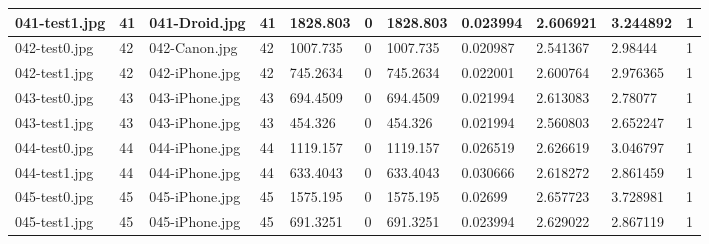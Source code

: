 \begin{landscape}
\begin{longtable}{|p{2cm}|p{1cm}|p{2cm}|p{1cm}|p{2cm}|p{1cm}|p{2cm}|p{2cm}|p{2cm}|p{2cm}|p{1cm}|}
		041-test1.jpg   & 41               & 041-Droid.jpg         & 41                          & 1828.803              & 0                       & 1828.803                   & 0.023994              & 2.606921              & 3.244892                 & 1                \\ \hline
		042-test0.jpg   & 42               & 042-Canon.jpg         & 42                          & 1007.735              & 0                       & 1007.735                   & 0.020987              & 2.541367              & 2.98444                  & 1                \\ \hline
		042-test1.jpg   & 42               & 042-iPhone.jpg        & 42                          & 745.2634              & 0                       & 745.2634                   & 0.022001              & 2.600764              & 2.976365                 & 1                \\ \hline
		043-test0.jpg   & 43               & 043-iPhone.jpg        & 43                          & 694.4509              & 0                       & 694.4509                   & 0.021994              & 2.613083              & 2.78077                  & 1                \\ \hline
		043-test1.jpg   & 43               & 043-iPhone.jpg        & 43                          & 454.326               & 0                       & 454.326                    & 0.021994              & 2.560803              & 2.652247                 & 1                \\ \hline
		044-test0.jpg   & 44               & 044-iPhone.jpg        & 44                          & 1119.157              & 0                       & 1119.157                   & 0.026519              & 2.626619              & 3.046797                 & 1                \\ \hline
		044-test1.jpg   & 44               & 044-iPhone.jpg        & 44                          & 633.4043              & 0                       & 633.4043                   & 0.030666              & 2.618272              & 2.861459                 & 1                \\ \hline
		045-test0.jpg   & 45               & 045-iPhone.jpg        & 45                          & 1575.195              & 0                       & 1575.195                   & 0.02699               & 2.657723              & 3.728981                 & 1                \\ \hline
		045-test1.jpg   & 45               & 045-iPhone.jpg        & 45                          & 691.3251              & 0                       & 691.3251                   & 0.023994              & 2.629022              & 2.867119                 & 1                \\ \hline

\end{longtable}
\end{landscape}
